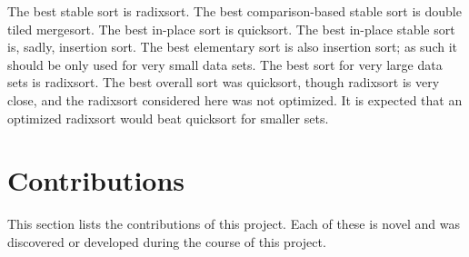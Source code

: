 
The best stable sort is radixsort. The best comparison-based stable sort is
double tiled mergesort. The best in-place sort is quicksort. The best in-place
stable sort is, sadly, insertion sort. The best elementary sort is also
insertion sort; as such it should be only used for very small data sets.  The
best sort for very large data sets is radixsort. The best overall sort was
quicksort, though radixsort is very close, and the radixsort considered here was
not optimized. It is expected that an optimized radixsort would beat quicksort
for smaller sets.

\section{Contributions}

This section lists the contributions of this project. Each of these is novel  
and was discovered or developed during the course of this project.

